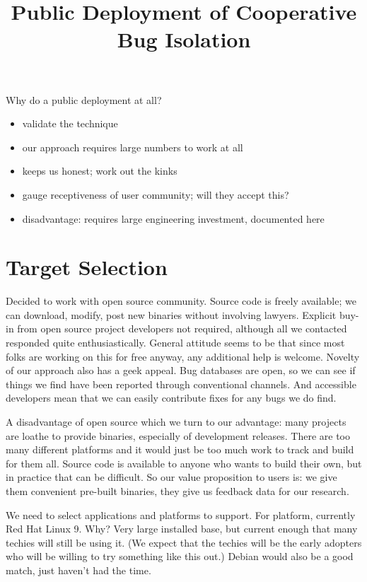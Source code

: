 \documentclass[10pt,twocolumn]{article}
\begin{document}
\title{Public Deployment of Cooperative Bug Isolation}


\maketitle

Why do a public deployment at all?

\begin{itemize}
\item validate the technique
\item our approach requires large numbers to work at all
\item keeps us honest; work out the kinks
\item gauge receptiveness of user community; will they accept this?
\item disadvantage: requires large engineering investment, documented here
\end{itemize}

\section{Target Selection}

Decided to work with open source community.  Source code is freely
available; we can download, modify, post new binaries without
involving lawyers.  Explicit buy-in from open source project
developers not required, although all we contacted responded quite
enthusiastically.  General attitude seems to be that since most folks
are working on this for free anyway, any additional help is welcome.
Novelty of our approach also has a geek appeal.  Bug databases are
open, so we can see if things we find have been reported through
conventional channels.  And accessible developers mean that we can
easily contribute fixes for any bugs we do find.

A disadvantage of open source which we turn to our advantage: many
projects are loathe to provide binaries, especially of development
releases.  There are too many different platforms and it would just be
too much work to track and build for them all.  Source code is
available to anyone who wants to build their own, but in practice that
can be difficult.  So our value proposition to users is: we give them
convenient pre-built binaries, they give us feedback data for our
research.

We need to select applications and platforms to support.  For
platform, currently Red Hat Linux 9.  Why?  Very large installed base,
but current enough that many techies will still be using it.  (We
expect that the techies will be the early adopters who will be willing
to try something like this out.)  Debian would also be a good match,
just haven't had the time.
\end{document}
